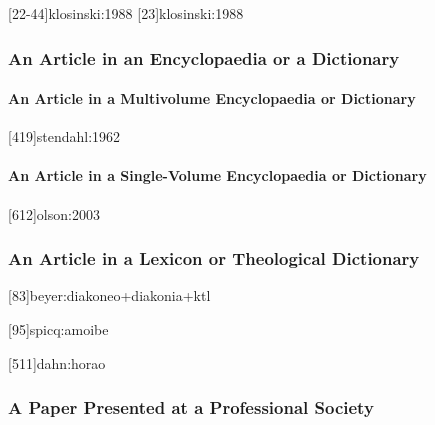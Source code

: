 \documentclass[a4paper]{article}
\begin{document}
[22-44]{klosinski:1988}
[23]{klosinski:1988}

\subsubsection{An Article in an Encyclopaedia or a Dictionary}

\paragraph{An Article in a Multivolume Encyclopaedia or Dictionary}

[419]{stendahl:1962}
\toggletrue{fullbibrefs}
\togglefalse{fullbibrefs}

\paragraph{An Article in a Single-Volume Encyclopaedia or Dictionary}

[612]{olson:2003}

\subsubsection{An Article in a Lexicon or Theological Dictionary}


[83]{beyer:diakoneo+diakonia+ktl}


[95]{spicq:amoibe}


[511]{dahn:horao}

\subsubsection{A Paper Presented at a Professional Society}
\end{document}
